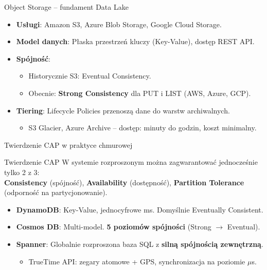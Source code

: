 \documentclass[aspectratio=169]{beamer}
\begin{document}
\begin{frame}{Object Storage – fundament Data Lake}
    \begin{itemize}
        \item \textbf{Usługi}: Amazon S3, Azure Blob Storage, Google Cloud Storage.
        \item \textbf{Model danych}: Płaska przestrzeń kluczy (Key-Value), dostęp REST API.
        \item \textbf{Spójność}:
        \begin{itemize}
            \item Historycznie S3: Eventual Consistency.
            \item Obecnie: \textbf{Strong Consistency} dla PUT i LIST (AWS, Azure, GCP).
        \end{itemize}
        \item \textbf{Tiering}: Lifecycle Policies przenoszą dane do warstw archiwalnych.
        \begin{itemize}
            \item S3 Glacier, Azure Archive – dostęp: minuty do godzin, koszt minimalny.
        \end{itemize}
    \end{itemize}
\end{frame}

\begin{frame}{Twierdzenie CAP w praktyce chmurowej}
    \begin{block}{Twierdzenie CAP}
        W systemie rozproszonym można zagwarantować jednocześnie tylko 2 z 3: \\
        \textbf{Consistency} (spójność), \textbf{Availability} (dostępność), \textbf{Partition Tolerance} (odporność na partycjonowanie).
    \end{block}
    \begin{itemize}
        \item \textbf{DynamoDB}: Key-Value, jednocyfrowe ms. Domyślnie Eventually Consistent.
        \item \textbf{Cosmos DB}: Multi-model. \textbf{5 poziomów spójności} (Strong $\rightarrow$ Eventual).
        \item \textbf{Spanner}: Globalnie rozproszona baza SQL z \textbf{silną spójnością zewnętrzną}.
        \begin{itemize}
            \item TrueTime API: zegary atomowe + GPS, synchronizacja na poziomie $\mu$s.
        \end{itemize}
    \end{itemize}
\end{frame}
\end{document}
